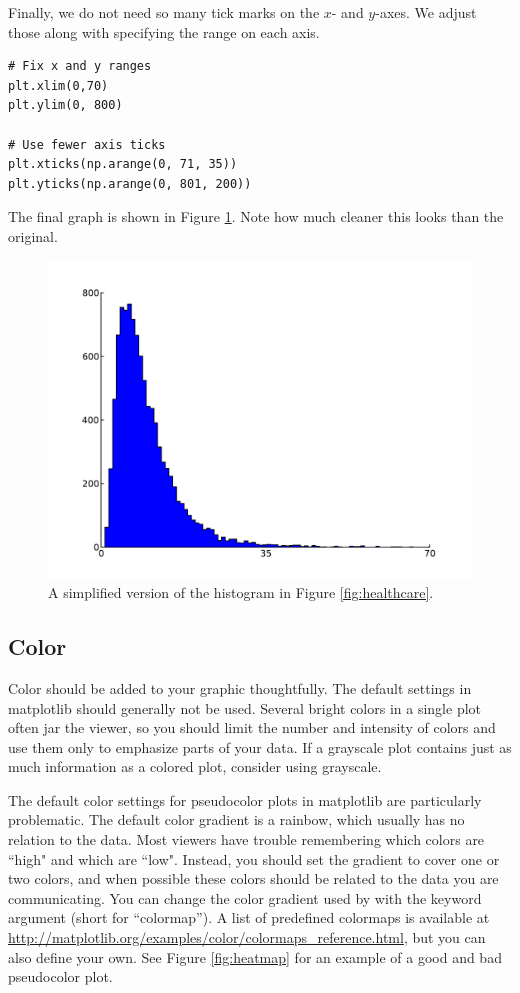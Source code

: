 Finally, we do not need so many tick marks on the $x$- and $y$-axes. 
We adjust those along with specifying the range on each axis.

\begin{lstlisting}
# Fix x and y ranges
plt.xlim(0,70)
plt.ylim(0, 800)

# Use fewer axis ticks
plt.xticks(np.arange(0, 71, 35))
plt.yticks(np.arange(0, 801, 200))
\end{lstlisting}

The final graph is shown in Figure \ref{fig:simplify}. 
Note how much cleaner this looks than the original.

\begin{figure}
\centering
\includegraphics[width=\textwidth]{simplify.pdf}
\caption{A simplified version of the histogram in Figure \ref{fig:healthcare}.}
\label{fig:simplify}
\end{figure}


\subsection*{Color}
Color should be added to your graphic thoughtfully. 
The default settings in matplotlib should generally not be used. 
Several bright colors in a single plot often jar the viewer, so you should limit the number and intensity of colors and use them only to emphasize parts of your data. 
If a grayscale plot contains just as much information as a colored plot, consider using grayscale.

The default color settings for pseudocolor plots in matplotlib are particularly problematic. 
The default color gradient is a rainbow, which usually has no relation to the data. 
Most viewers have trouble remembering which colors are ``high" and which are ``low". 
Instead, you should set the gradient to cover one or two colors, and when possible these colors should be related to the data you are communicating. 
You can change the color gradient used by  with the keyword argument  (short for ``colormap''). 
A list of predefined colormaps is available at \url{http://matplotlib.org/examples/color/colormaps_reference.html}, but you can also define your own. 
See Figure \ref{fig:heatmap} for an example of a good and bad pseudocolor plot.


